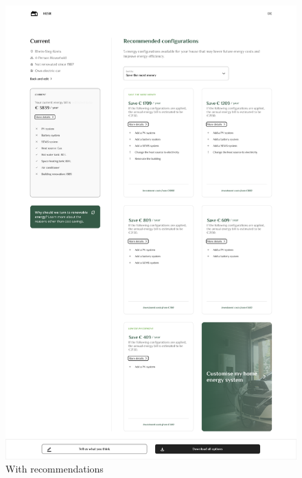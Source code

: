 \begin{figure}[h!]
  \centering
  \includegraphics[width=\textwidth]{Images/recommendation.png}
  \caption{With recommendations}
  \label{fig:recommendation}
\end{figure}

